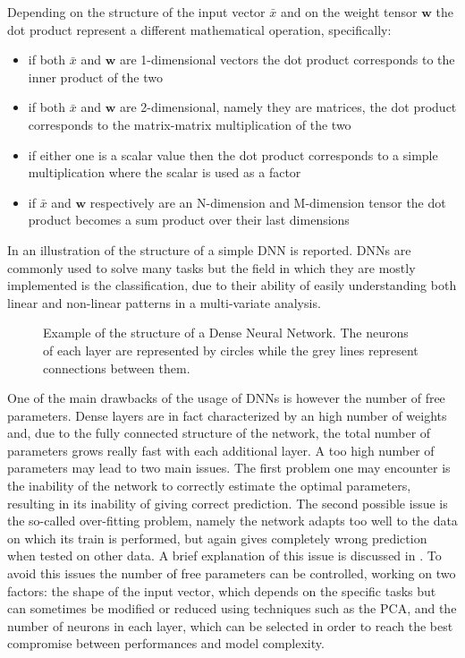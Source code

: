 Depending on the structure of the input vector $\bar{x}$ and on the weight tensor $\boldsymbol{w}$ the dot product represent a different mathematical operation, specifically:
\begin{itemize}
    \item if both $\bar{x}$ and $\boldsymbol{w}$ are 1-dimensional vectors the dot product corresponds to the inner product of the two
    \item if both $\bar{x}$ and $\boldsymbol{w}$ are 2-dimensional, namely they are matrices, the dot product corresponds to the matrix-matrix multiplication of the two
     \item if either one is a scalar value then the dot product corresponds to a simple multiplication where the scalar is used as a factor
     \item if $\bar{x}$ and $\boldsymbol{w}$ respectively are an N-dimension and M-dimension tensor the dot product becomes a sum product over their last dimensions
\end{itemize}

In  an illustration of the structure of a simple DNN is reported. DNNs are commonly used to solve many tasks but the field in which they are mostly implemented is the classification, due to their ability of easily understanding both linear and non-linear patterns in a multi-variate analysis.


\begin{figure}
    \centering

    \caption{Example of the structure of a Dense Neural Network. The neurons of each layer are represented by circles while the grey lines represent connections between them.}
    \label{fig:dnn_example}
\end{figure}

One of the main drawbacks of the usage of DNNs is however the number of free parameters. Dense layers are in fact characterized by an high number of weights and, due to the fully connected structure of the network, the total number of parameters grows really fast with each additional layer. 
A too high number of parameters may lead to two main issues. The first problem one may encounter is the inability of the network to correctly estimate the optimal parameters, resulting in its inability of giving correct prediction. The second possible issue is the so-called over-fitting problem, namely the network adapts too well to the data on which its train is performed, but again gives completely wrong prediction when tested on other data. A brief explanation of this issue is discussed in .
To avoid this issues the number of free parameters can be controlled, working on two factors: the shape of the input vector, which depends on the specific tasks but can sometimes be modified or reduced using techniques such as the PCA, and the number of neurons in each layer, which can be selected in order to reach the best compromise between performances and model complexity.

